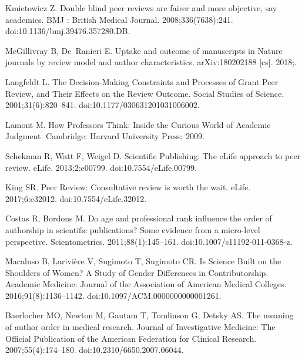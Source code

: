 \documentclass[10pt,letterpaper]{article}
\begin{document}
\begin{thebibliography}{100}
Kmietowicz Z.
\newblock Double blind peer reviews are fairer and more objective, say
  academics.
\newblock BMJ : British Medical Journal. 2008;336(7638):241.
\newblock doi:{10.1136/bmj.39476.357280.DB}.

McGillivray B, De~Ranieri E.
\newblock Uptake and outcome of manuscripts in {Nature} journals by review
  model and author characteristics.
\newblock arXiv:180202188 [cs]. 2018;.

Langfeldt L.
\newblock The {Decision}-{Making} {Constraints} and {Processes} of {Grant}
  {Peer} {Review}, and {Their} {Effects} on the {Review} {Outcome}.
\newblock Social Studies of Science. 2001;31(6):820--841.
\newblock doi:{10.1177/030631201031006002}.

Lamont M.
\newblock How {Professors} {Think}: {Inside} the {Curious} {World} of
  {Academic} {Judgment}.
\newblock Cambridge: Harvard University Press; 2009.

Schekman R, Watt F, Weigel D.
\newblock Scientific {Publishing}: {The} {eLife} approach to peer review.
\newblock eLife. 2013;2:e00799.
\newblock doi:{10.7554/eLife.00799}.

King SR.
\newblock Peer {Review}: {Consultative} review is worth the wait.
\newblock eLife. 2017;6:e32012.
\newblock doi:{10.7554/eLife.32012}.

Costas R, Bordons M.
\newblock Do age and professional rank influence the order of authorship in
  scientific publications? {Some} evidence from a micro-level perspective.
\newblock Scientometrics. 2011;88(1):145--161.
\newblock doi:{10.1007/s11192-011-0368-z}.

Macaluso B, Larivi{\`e}re V, Sugimoto T, Sugimoto CR.
\newblock Is {Science} {Built} on the {Shoulders} of {Women}? {A} {Study} of
  {Gender} {Differences} in {Contributorship}.
\newblock Academic Medicine: Journal of the Association of American Medical
  Colleges. 2016;91(8):1136--1142.
\newblock doi:{10.1097/ACM.0000000000001261}.

Baerlocher MO, Newton M, Gautam T, Tomlinson G, Detsky AS.
\newblock The meaning of author order in medical research.
\newblock Journal of Investigative Medicine: The Official Publication of the
  American Federation for Clinical Research. 2007;55(4):174--180.
\newblock doi:{10.2310/6650.2007.06044}.


\end{thebibliography}
\end{document}
